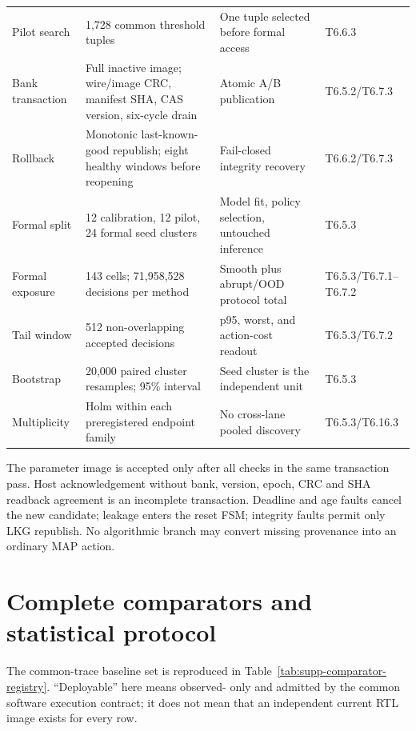 \documentclass[11pt]{article}
\begin{document}
{\begin{longtable}{@{}L{0.20\textwidth} L{0.25\textwidth} L{0.25\textwidth} L{0.20\textwidth}@{}}
Pilot search & 1,728 common threshold tuples & One tuple selected before formal access & T6.6.3 \\
Bank transaction & Full inactive image; wire/image CRC, manifest SHA, CAS version, six-cycle drain & Atomic A/B publication & T6.5.2/T6.7.3 \\
Rollback & Monotonic last-known-good republish; eight healthy windows before reopening & Fail-closed integrity recovery & T6.6.2/T6.7.3 \\
Formal split & 12 calibration, 12 pilot, 24 formal seed clusters & Model fit, policy selection, untouched inference & T6.5.3 \\
Formal exposure & 143 cells; 71,958,528 decisions per method & Smooth plus abrupt/OOD protocol total & T6.5.3/T6.7.1--T6.7.2 \\
Tail window & 512 non-overlapping accepted decisions & p95, worst, and action-cost readout & T6.5.3/T6.7.2 \\
Bootstrap & 20,000 paired cluster resamples; 95\% interval & Seed cluster is the independent unit & T6.5.3 \\
Multiplicity & Holm within each preregistered endpoint family & No cross-lane pooled discovery & T6.5.3/T6.16.3 \\
\bottomrule
\end{longtable}
}

The parameter image is accepted only after all checks in the same transaction
pass.  Host acknowledgement without bank, version, epoch, CRC and SHA readback
agreement is an incomplete transaction.  Deadline and age faults cancel the
new candidate; leakage enters the reset FSM; integrity faults permit only LKG
republish.  No algorithmic branch may convert missing provenance into an
ordinary MAP action.

\section{Complete comparators and statistical protocol}

The common-trace baseline set is reproduced in
Table~\ref{tab:supp-comparator-registry}.  ``Deployable'' here means observed-
only and admitted by the common software execution contract; it does not mean
that an independent current RTL image exists for every row.
\end{document}

